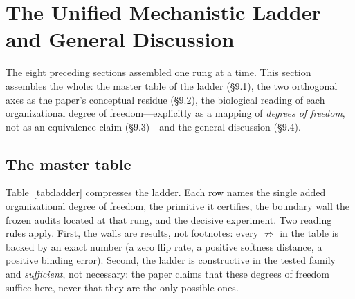 \section{The Unified Mechanistic Ladder and General Discussion}
\label{sec:ladder}

The eight preceding sections assembled one rung at a time. This section
assembles the whole: the master table of the ladder (§9.1), the two
orthogonal axes as the paper's conceptual residue (§9.2), the biological
reading of each organizational degree of freedom---explicitly as a mapping
of \emph{degrees of freedom}, not as an equivalence claim (§9.3)---and the
general discussion (§9.4).

\subsection{The master table}
\label{sec:master}

Table~\ref{tab:ladder} compresses the ladder. Each row names the single
added organizational degree of freedom, the primitive it certifies, the
boundary wall the frozen audits located at that rung, and the decisive
experiment. Two reading rules apply. First, the walls are results, not
footnotes: every $\not\Rightarrow$ in the table is backed by an exact
number (a zero flip rate, a positive softness distance, a positive binding
error). Second, the ladder is constructive in the tested family and
\emph{sufficient}, not necessary: the paper claims that these degrees of
freedom suffice here, never that they are the only possible ones.

